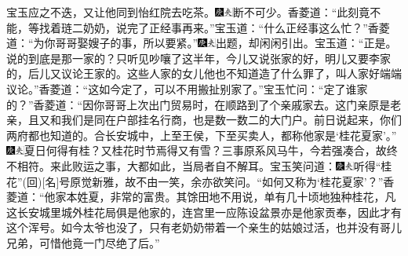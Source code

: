 宝玉应之不迭，又让他同到怡红院去吃茶。{\includegraphics[width=3mm]{../Images/00004}\includegraphics[width=3mm]{../Images/00012}\footnotesize \kaishu 断不可少。}香菱道：“此刻竟不能，等找着琏二奶奶，说完了正经事再来。”宝玉道：“什么正经事这么忙？”香菱道：“为你哥哥娶嫂子的事，所以要紧。”{\includegraphics[width=3mm]{../Images/00004}\includegraphics[width=3mm]{../Images/00012}\footnotesize \kaishu 出题，却闲闲引出。}宝玉道：“正是。说的到底是那一家的？只听见吵嚷了这半年，今儿又说张家的好，明儿又要李家的，后儿又议论王家的。这些人家的女儿他也不知道造了什么罪了，叫人家好端端议论。”香菱道：“这如今定了，可以不用搬扯别家了。”宝玉忙问：“定了谁家的？”香菱道：“因你哥哥上次出门贸易时，在顺路到了个亲戚家去。这门亲原是老亲，且又和我们是同在户部挂名行商，也是数一数二的大门户。前日说起来，你们两府都也知道的。合长安城中，上至王侯，下至买卖人，都称他家是‘桂花夏家’。”{\includegraphics[width=3mm]{../Images/00004}\includegraphics[width=3mm]{../Images/00012}\footnotesize \kaishu 夏日何得有桂？又桂花时节焉得又有雪？三事原系风马牛，今若强凑合，故终不相符。来此败运之事，大都如此，当局者自不解耳。}宝玉笑问道：{\includegraphics[width=3mm]{../Images/00004}\includegraphics[width=3mm]{../Images/00012}\footnotesize \kaishu 听得“桂花”{(回)}{[}名{]}号原觉新雅，故不由一笑，余亦欲笑问。}“如何又称为‘桂花夏家’？”香菱道：“他家本姓夏，非常的富贵。其馀田地不用说，单有几十顷地独种桂花，凡这长安城里城外桂花局俱是他家的，连宫里一应陈设盆景亦是他家贡奉，因此才有这个浑号。如今太爷也没了，只有老奶奶带着一个亲生的姑娘过活，也并没有哥儿兄弟，可惜他竟一门尽绝了后。”

